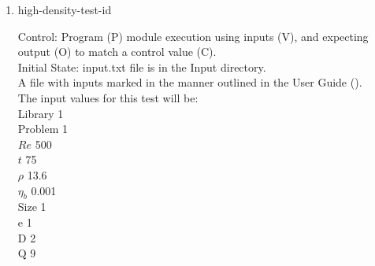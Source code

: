 \documentclass[12pt, titlepage]{article}
\newcommand{\famname}{Lattice Boltzmann Solver}
\newcounter{testcounter} %
\begin{document}
\begin{enumerate}
Output: Vorticity vector values printed to the screen. \\

Test Case Derivation: This case is a comparison with the pseudo-oracle
pyLBM. The C values of this test for pyLBM can be found in the file
id7output.txt located in the OracleOutput folder. The output values of {\famname} will be compared to the pseudo-oracle output values.\\

This test covers the low bound for density using a density of liquid hydrogen.\\
					
How test will be performed: 

\begin{enumerate}
\item The Von Karman Vortex Street module shall be modified by the author to
  print the vorticity vector as output.
\item Outside of the system, the input parameter values will be written to a text file titled input.txt, as outlined in the User Guide.
\item The file will be placed into the Input directory, under the home directory of the project.
\item {\famname} shall be run.
\item Upon completion of the module, the output values of the vorticity vector
  will be compared to the vorticity vector values from pyLBM - comparison will
  be done per cell. Comparisons can be done manually using Excel, or through a
  script, using the equation for relative error found in Section \ref{eqerror}.
\end{enumerate}

\item{high-density-test-id\thetestcounter \\}

Control: Program (P) module execution using inputs (V), and expecting output (O)
to match a control value (C).\\

Initial State: input.txt file is in the Input directory.\\
					
A file with inputs marked in the manner outlined in the User
Guide (\citet{LBM_UserGuide_PM}).\\The input values for this test will be:\\
  Library 1\\
Problem 1\\
$Re$ 500\\
$t$ 75\\
$\rho$ 13.6\\
$\eta_b$ 0.001\\
Size 1\\
$\mathrm{e}$ 1\\
$\mathrm{D}$ 2\\
$\mathrm{Q}$ 9\\


\end{enumerate}
\end{document}
